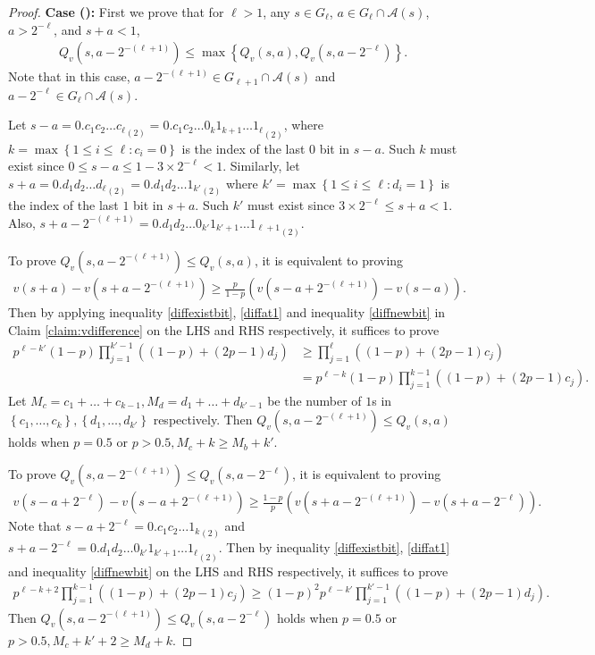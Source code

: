 \documentclass{article}
\theoremstyle{named}
\newcommand{\cA}{\mathcal{A}}
\newcommand{\set}[1]{\left\{#1\right\}}
\newcommand{\bracket}[1]{\left(#1\right)}
\begin{document}
\begin{proof}
\textbf{Case ():} First we prove that for $\ell>1$, any $s\in G_\ell$, $a\in G_\ell \cap \cA(s)$, $a>2^{-\ell}$, and $s+a<1$,
\begin{align*}
Q_v\bracket{s,a-2^{-(\ell+1)}} \le \max\set{Q_v(s,a), Q_v\bracket{s,a-2^{-\ell}}} .
\end{align*}
Note that in this case, $a-2^{-(\ell+1)} \in G_{\ell+1} \cap \cA(s)$ and $a-2^{-\ell} \in G_{\ell} \cap \cA(s)$.

Let $s-a={0.c_1 c_2 \dots c_\ell}_{(2)} = {0.c_1 c_2 \dots 0_{k} 1_{k+1} \dots 1_{\ell}}_{(2)}$, where $k = \max\set{1\le i \le \ell: c_i=0}$ is the index of the last $0$ bit in $s-a$. Such $k$ must exist since $0 \le s-a \le 1 - 3\times 2^{-\ell}<1$. 
Similarly, let $s+a = {0.d_1 d_2\dots d_{\ell}}_{(2)} = {0.d_1 d_2 \dots 1_{k'}}_{(2)}$ where $k'= \max\set{1\le i \le \ell: d_i=1}$ is the index of the last $1$ bit in $s+a$. Such $k'$ must exist since $3\times 2^{-\ell} \le s+a <1$. Also, $s+a-2^{-(\ell+1)} = {0.d_1 d_2 \dots 0_{k'}1_{k'+1}\dots 1_{\ell+1}}_{(2)}$. 

To prove $Q_v\bracket{s,a-2^{-(\ell+1)}} \le Q_v(s,a)$, it is equivalent to proving
\begin{align*}
v(s+a) - v\bracket{s+a-2^{-(\ell+1)}} \ge \frac{p}{1-p} \bracket{v\bracket{s-a+2^{-(\ell+1)}} - v(s-a)} .
\end{align*}
Then by applying inequality \eqref{diffexistbit}, \eqref{diffat1} and inequality \eqref{diffnewbit} in Claim \ref{claim:vdifference} on the LHS and RHS respectively, it suffices to prove
\begin{align*}
p^{\ell-k'}(1-p)\prod_{j=1}^{k'-1} ((1-p)+(2p-1)d_j) &\ge \prod_{j=1}^\ell ((1-p)+(2p-1)c_j) \\
&= p^{\ell-k}(1-p) \prod_{j=1}^{k-1} ((1-p)+(2p-1)c_j) .
\end{align*}
Let $M_c = c_1 + \dots + c_{k-1}, M_d = d_1 + \dots + d_{k'-1}$ be the number of $1$s in $\set{c_1, \ldots, c_{k}}, \set{d_1, \ldots, d_{k'}}$ respectively. Then $Q_v\bracket{s,a-2^{-(\ell+1)}} \le Q_v(s,a)$ holds when $p=0.5$ or $p> 0.5, M_c + k \ge M_b + k'$.

To prove $Q_v\bracket{s,a-2^{-(\ell+1)}} \le Q_v\bracket{s,a-2^{-\ell}}$, it is equivalent to proving
\begin{align*}
    v\bracket{s-a+2^{-\ell}} - v\bracket{s-a+2^{-(\ell+1)}} \ge \frac{1-p}{p} \bracket{v\bracket{s+a-2^{-(\ell+1)}} - v\bracket{s+a-2^{-\ell}} }  .
\end{align*}
Note that $s-a+2^{-\ell} = {0.c_1 c_2 \dots 1_{k}}_{(2)}$ and $s+a-2^{-\ell} = {0.d_1 d_2 \dots 0_{k'} 1_{k'+1} \dots 1_{\ell}}_{(2)}$. Then by inequality \eqref{diffexistbit}, \eqref{diffat1} and inequality \eqref{diffnewbit} on the LHS and RHS respectively, it suffices to prove
\begin{align*}
    p^{\ell-k+2} \prod_{j=1}^{k-1} ((1-p)+(2p-1)c_j) \ge (1-p)^2 p^{\ell-k'} \prod_{j=1}^{k'-1} ((1-p)+(2p-1)d_j) .
\end{align*}
Then $Q_v\bracket{s,a-2^{-(\ell+1)}} \le Q_v\bracket{s,a-2^{-\ell}}$ holds when $p=0.5$ or $p> 0.5, M_c+k'+2\ge M_d+k$. 


\end{proof}
\end{document}
